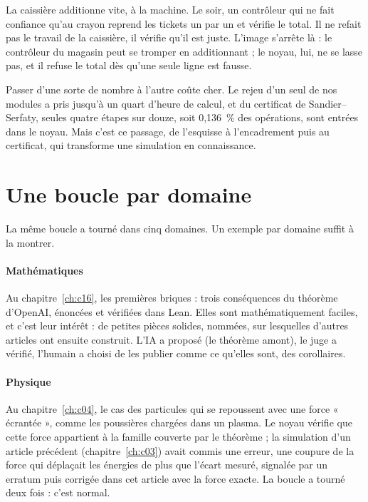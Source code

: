 \begin{analogie}
La caissière additionne vite, à la machine. Le soir, un contrôleur qui ne fait confiance qu'au crayon reprend les
tickets un par un et vérifie le total. Il ne refait pas le travail de la caissière, il vérifie qu'il est juste.
L'image s'arrête là : le contrôleur du magasin peut se tromper en additionnant ; le noyau, lui, ne se lasse pas, et
il refuse le total dès qu'une seule ligne est fausse.
\end{analogie}

Passer d'une sorte de nombre à l'autre coûte cher. Le rejeu d'un seul de nos modules a pris jusqu'à un quart d'heure
de calcul, et du certificat de Sandier--Serfaty, seules quatre étapes sur douze, soit 0,136~\% des opérations, sont
entrées dans le noyau. Mais c'est ce passage, de
l'esquisse à l'encadrement puis au certificat, qui transforme une simulation en connaissance.

\section{Une boucle par domaine}

La même boucle a tourné dans cinq domaines. Un exemple par domaine suffit à la montrer.

\paragraph{Mathématiques} Au chapitre~\ref{ch:c16}, les premières briques : trois conséquences du théorème d'OpenAI,
énoncées et vérifiées dans Lean. Elles sont mathématiquement faciles, et c'est leur intérêt : de petites pièces
solides, nommées, sur lesquelles d'autres articles ont ensuite construit. L'IA a proposé (le théorème amont), le juge
a vérifié, l'humain a choisi de les publier comme ce qu'elles sont, des corollaires.

\paragraph{Physique} Au chapitre~\ref{ch:c04}, le cas des particules qui se repoussent avec une force « écrantée »,
comme les poussières chargées dans un plasma. Le noyau vérifie que cette force appartient à la famille couverte par le
théorème ; la simulation d'un article précédent (chapitre~\ref{ch:c03}) avait commis une erreur, une coupure de la
force qui déplaçait les énergies de plus que l'écart mesuré, signalée par un erratum puis corrigée dans cet article
avec la force exacte. La boucle a tourné deux fois : c'est normal.

